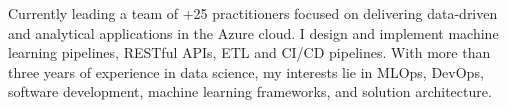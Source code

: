 

\begin{cvparagraph}

Currently leading a team of +25 practitioners focused on delivering data-driven and analytical applications in the Azure cloud. I design and implement machine learning pipelines, RESTful APIs, ETL and CI/CD pipelines. With more than three years of experience in data science, my interests lie in MLOps, DevOps, software development, machine learning frameworks, and solution architecture.
\end{cvparagraph}
